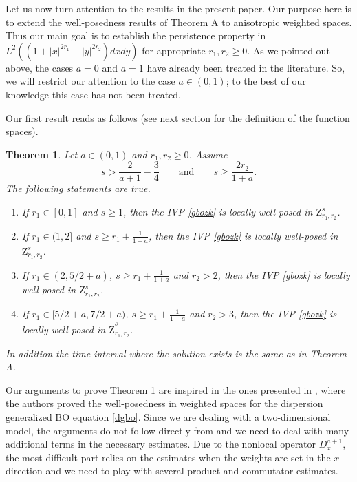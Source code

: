 \documentclass[reqno]{amsart}
\numberwithin{equation}{section}
\newtheorem{theorem}{Theorem}[section]
\begin{document}
Let us now turn attention to the results in the present paper. Our purpose here is to extend the  well-posedness  results of Theorem A to anisotropic weighted spaces. Thus our main goal is to establish the persistence property in $ L^2((1+|x|^{2r_1}+|y|^{2r_2})dxdy)$ for appropriate $r_1,r_2\geq0$. As we pointed out above, the cases $a=0$ and $a=1$ have already been treated in the literature. So, we will restrict our attention to the case $a\in(0,1)$; to the best of our knowledge this case has not been treated.


Our first result reads as follows (see next section for the definition of the function spaces).


\begin{theorem}\label{anisogbozk}	Let $a\in (0,1)$ and $r_1,r_2\geq0$. Assume
\[
s>\frac{2}{a+1}-\frac{3}{4} \qquad \mbox{and} \qquad s\geq \frac{2r_2}{1+a}.
\] 
The following statements are true.
	\begin{enumerate}
	\item [1)] If $r_1\in [0,1]$ and $s\geq 1$, then the IVP \eqref{gbozk} is locally well-posed in $\mathrm{Z}^{s}_{r_1,r_2}$.
	\item[2)] If $r_1\in(1,2]$ and $s\geq r_1+\frac{1}{1+a}$, then the IVP \eqref{gbozk} is locally well-posed in $\mathrm{Z}^{s}_{r_1,r_2}$.
	
\item [3)] If $r_1 \in (2,5/2+a)$, $s\geq r_1+\frac{1}{1+a}$ and $r_2>2$, then the IVP \eqref{gbozk} is locally well-posed in $\mathrm{Z}^{s}_{r_1,r_2}$.
		
		\item[4)] If $r_1\in [5/2+a,7/2+a)$, $s\geq r_1+\frac{1}{1+a}$ and $r_2>3$, then the IVP \eqref{gbozk} is locally well-posed in $\dot{\mathrm{Z}}_{r_{1},r_{2}}^{s}$.
\end{enumerate}
In addition the time interval where the solution exists is the same as in Theorem A.
\end{theorem}

Our arguments to prove Theorem \ref{anisogbozk} are inspired in the ones presented in \cite{FLP1}, where the authors proved the well-posedness in weighted spaces for the dispersion generalized BO equation \eqref{dgbo}. Since we are dealing with a two-dimensional model,  the arguments do not follow directly from \cite{FLP1} and we need to deal with many additional terms in the necessary estimates. Due to the nonlocal operator $D^{a+1}_x$,  the most difficult part relies on the estimates when the weights are set in the $x$-direction and we need to play with several product and commutator estimates.
\end{document}
